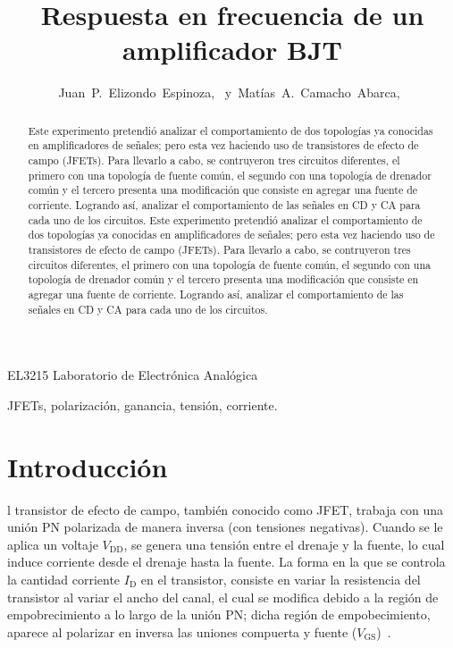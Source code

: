 \documentclass[journal]{IEEEtran}
\begin{document}
\title{Respuesta en frecuencia de un amplificador BJT}


\author{Juan~P.~Elizondo~Espinoza,~
        y~Matías~A.~Camacho~Abarca,~
}


%
{EL3215 Laboratorio de Electrónica Analógica}


\maketitle


\begin{abstract}
Este experimento pretendió analizar el comportamiento de dos topologías ya conocidas en amplificadores de señales; pero esta vez haciendo uso de
transistores de efecto de campo (JFETs). Para llevarlo a cabo, se contruyeron tres circuitos diferentes, el primero con una topología de 
fuente común, el segundo con una topología de drenador común y el tercero presenta una modificación que consiste en agregar una fuente de corriente.
Logrando así, analizar el comportamiento de las señales en CD y CA para cada uno de los circuitos. 
Este experimento pretendió analizar el comportamiento de dos topologías ya conocidas en amplificadores de señales; pero esta vez haciendo uso de
transistores de efecto de campo (JFETs). Para llevarlo a cabo, se contruyeron tres circuitos diferentes, el primero con una topología de 
fuente común, el segundo con una topología de drenador común y el tercero presenta una modificación que consiste en agregar una fuente de corriente.
Logrando así, analizar el comportamiento de las señales en CD y CA para cada uno de los circuitos. 
\end{abstract}

\begin{IEEEkeywords}
JFETs, polarización, ganancia, tensión, corriente.
\end{IEEEkeywords}


\section{Introducción}

l transistor de efecto de campo, también conocido como JFET, trabaja con una unión PN
polarizada de manera inversa (con tensiones negativas). Cuando se le aplica un voltaje $V_{\text{DD}}$, se genera 
una tensión entre el drenaje y la fuente, lo cual induce corriente desde el drenaje hasta la fuente. La forma en la 
que se controla la cantidad corriente $I_{\text{D}}$ en el transistor, consiste en variar la resistencia del transistor
al variar el ancho del canal, el cual se modifica debido a la región de empobrecimiento a lo largo de la unión PN;
dicha región de empobecimiento, aparece al polarizar en inversa las uniones compuerta y fuente ($V_{\text{GS}}$)~\cite{Floyd}.
\end{document}

